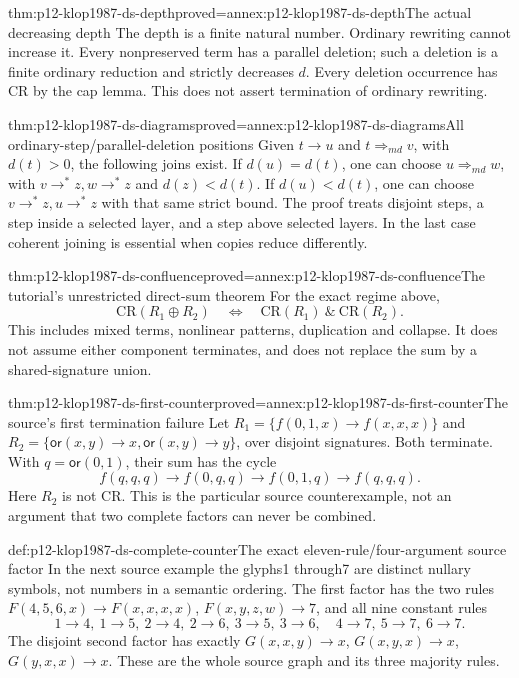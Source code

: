 \begin{hblemma}{thm:p12-klop1987-ds-depth}{proved=annex:p12-klop1987-ds-depth}{The actual decreasing depth}
The depth is a finite natural number. Ordinary rewriting cannot
increase it. Every nonpreserved term has a parallel deletion;
such a deletion is a finite ordinary reduction and strictly
decreases \(d\). Every deletion occurrence has CR by the cap
lemma. This does not assert termination of ordinary rewriting.
\end{hblemma}

\begin{hblemma}{thm:p12-klop1987-ds-diagrams}{proved=annex:p12-klop1987-ds-diagrams}{All ordinary-step/parallel-deletion positions}
Given \(t\to u\) and \(t\Rightarrow_{
m d}v\), with
\(d(t)>0\), the following joins exist.
If \(d(u)=d(t)\), one can choose
\(u\Rightarrow_{
m d}w\), with \(v\to^*z,w\to^*z\)
and \(d(z)<d(t)\). If \(d(u)<d(t)\), one can choose
\(v\to^*z,u\to^*z\) with that same strict bound.
The proof treats disjoint steps, a step inside a selected layer,
and a step above selected layers. In the last case coherent
joining is essential when copies reduce differently.
\end{hblemma}

\begin{hbtheorem}{thm:p12-klop1987-ds-confluence}{proved=annex:p12-klop1987-ds-confluence}{The tutorial's unrestricted direct-sum theorem}
For the exact regime above,
\[
 \mathrm{CR}(R_1\oplus R_2)
 \quad\Longleftrightarrow\quad
 \mathrm{CR}(R_1)\ \mathbin{\&}\ \mathrm{CR}(R_2).
\]
This includes mixed terms, nonlinear patterns, duplication and
collapse. It does not assume either component terminates, and
does not replace the sum by a shared-signature union.
\end{hbtheorem}

\begin{hbtheorem}{thm:p12-klop1987-ds-first-counter}{proved=annex:p12-klop1987-ds-first-counter}{The source's first termination failure}
Let \(R_1=\{f(0,1,x)\to f(x,x,x)\}\) and
\(R_2=\{\mathsf{or}(x,y)\to x,\mathsf{or}(x,y)\to y\}\),
over disjoint signatures. Both terminate. With
\(q=\mathsf{or}(0,1)\), their sum has the cycle
\[
 f(q,q,q)\to f(0,q,q)\to f(0,1,q)\to f(q,q,q).
\]
Here \(R_2\) is not CR. This is the particular source counterexample,
not an argument that two complete factors can never be combined.
\end{hbtheorem}

\begin{hbdefinition}{def:p12-klop1987-ds-complete-counter}{The exact eleven-rule/four-argument source factor}
In the next source example the glyphs1 through7 are distinct
nullary symbols, not numbers in a semantic ordering. The first
factor has the two rules
\(F(4,5,6,x)\to F(x,x,x,x)\),
\(F(x,y,z,w)\to7\), and all nine constant rules
\[
1\to4,\ 1\to5,\ 2\to4,\ 2\to6,\ 3\to5,\ 3\to6,
\quad4\to7,\ 5\to7,\ 6\to7.
\]
The disjoint second factor has exactly
\(G(x,x,y)\to x\), \(G(x,y,x)\to x\),
\(G(y,x,x)\to x\).
These are the whole source graph and its three majority rules.
\end{hbdefinition}

